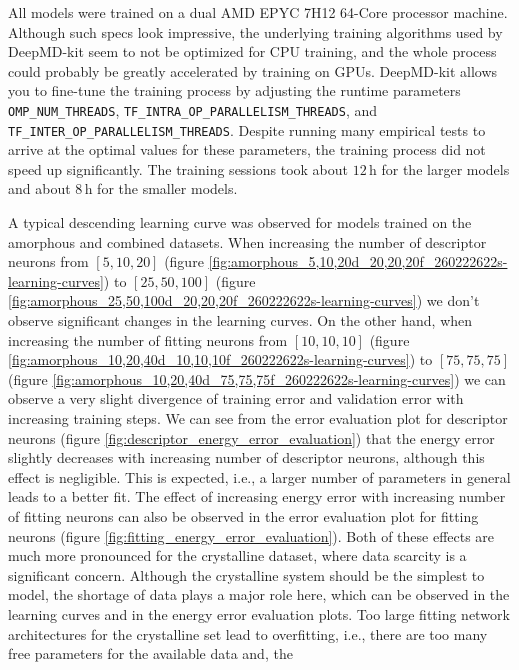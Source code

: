 All models were trained on a dual AMD EPYC 7H12 64-Core processor machine.
Although such specs look impressive, the underlying training algorithms used
by DeepMD-kit seem to not be optimized for CPU training, and the whole process
could probably be greatly accelerated by training on GPUs. DeepMD-kit allows
you to fine-tune the training process by adjusting the runtime parameters
\texttt{OMP\_NUM\_THREADS}, \texttt{TF\_INTRA\_OP\_PARALLELISM\_THREADS},
and \texttt{TF\_INTER\_OP\_PARALLELISM\_\allowbreak{}THREADS}. Despite running
many empirical tests to arrive at the optimal values for these parameters, the
training process did not speed up significantly. The training sessions took
about $12 \, \mathrm{h}$ for the larger models and about $8 \, \mathrm{h}$ for
the smaller models.

A typical descending learning curve was observed for models trained on the
amorphous and combined datasets. When increasing the number of descriptor
neurons from $[5, 10, 20]$ (figure
\ref{fig:amorphous_5,10,20d_20,20,20f_260222622s-learning-curves}) to
$[25, 50, 100]$ (figure
\ref{fig:amorphous_25,50,100d_20,20,20f_260222622s-learning-curves}) we don't
observe significant changes in the learning curves. On the other hand, when
increasing the number of fitting neurons from $[10, 10, 10]$
(figure \ref{fig:amorphous_10,20,40d_10,10,10f_260222622s-learning-curves}) to
$[75, 75, 75]$ (figure
\ref{fig:amorphous_10,20,40d_75,75,75f_260222622s-learning-curves}) we can
observe a very slight divergence of training error and validation error with
increasing training steps. We can see from the error evaluation plot for
descriptor neurons (figure \ref{fig:descriptor_energy_error_evaluation}) that
the energy error slightly decreases with increasing number of descriptor
neurons, although this effect is negligible. This is expected, i.e., a larger
number of parameters in general leads to a better fit. The effect of
increasing energy error with increasing number of fitting neurons can also be
observed in the error evaluation plot for fitting neurons (figure
\ref{fig:fitting_energy_error_evaluation}). Both of these effects are much
more pronounced for the crystalline dataset, where data scarcity is a
significant concern. Although the crystalline system should be the simplest
to model, the shortage of data plays a major role here, which can be observed
in the learning curves and in the energy error evaluation plots. Too large
fitting network architectures for the crystalline set lead to overfitting,
i.e., there are too many free parameters for the available data and, the
